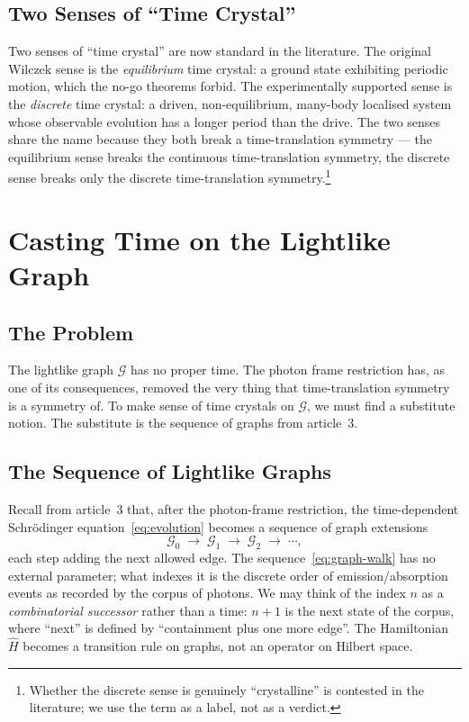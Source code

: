 \documentclass[11pt]{article}
\begin{document}
\subsection{Two Senses of ``Time Crystal''}

Two senses of ``time crystal'' are now standard in the literature. The original Wilczek sense is the \emph{equilibrium} time crystal: a ground state exhibiting periodic motion, which the no-go theorems forbid. The experimentally supported sense is the \emph{discrete} time crystal: a driven, non-equilibrium, many-body localised system whose observable evolution has a longer period than the drive. The two senses share the name because they both break a time-translation symmetry --- the equilibrium sense breaks the continuous time-translation symmetry, the discrete sense breaks only the discrete time-translation symmetry.\footnote{Whether the discrete sense is genuinely ``crystalline'' is contested in the literature; we use the term as a label, not as a verdict.}

\section{Casting Time on the Lightlike Graph}
\label{sec:baregraph}

\subsection{The Problem}

The lightlike graph $\mathcal{G}$ has no proper time. The photon frame restriction has, as one of its consequences, removed the very thing that time-translation symmetry is a symmetry of. To make sense of time crystals on $\mathcal{G}$, we must find a substitute notion. The substitute is the sequence of graphs from article~3.

\subsection{The Sequence of Lightlike Graphs}

Recall from article~3 that, after the photon-frame restriction, the time-dependent Schr\"odinger equation~\eqref{eq:evolution} becomes a sequence of graph extensions
\begin{equation}
\mathcal{G}_0 \;\to\; \mathcal{G}_1 \;\to\; \mathcal{G}_2 \;\to\; \cdots,
\label{eq:graph-walk}
\end{equation}
each step adding the next allowed edge. The sequence~\eqref{eq:graph-walk} has no external parameter; what indexes it is the discrete order of emission/absorption events as recorded by the corpus of photons. We may think of the index $n$ as a \emph{combinatorial successor} rather than a time: $n + 1$ is the next state of the corpus, where ``next'' is defined by ``containment plus one more edge''. The Hamiltonian $\hat{H}$ becomes a transition rule on graphs, not an operator on Hilbert space.
\end{document}
